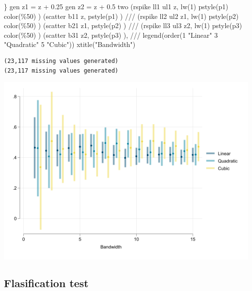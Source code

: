 \documentclass[
  letterpaper,
  DIV=11,
  numbers=noendperiod]{scrartcl}
\newenvironment{Shaded}{\begin{snugshade}}{\end{snugshade}}
\newcommand{\BaseNTok}[1]{\textcolor[rgb]{0.68,0.00,0.00}{#1}}
\newcommand{\CommentTok}[1]{\textcolor[rgb]{0.37,0.37,0.37}{#1}}
\newcommand{\KeywordTok}[1]{\textcolor[rgb]{0.00,0.23,0.31}{#1}}
\newcommand{\NormalTok}[1]{\textcolor[rgb]{0.00,0.23,0.31}{#1}}
\newcommand{\StringTok}[1]{\textcolor[rgb]{0.13,0.47,0.30}{#1}}
\begin{document}
\begin{Shaded}
\begin{Highlighting}[]
\NormalTok{\}}
\KeywordTok{gen}\NormalTok{ z1 = z + 0.25}
\KeywordTok{gen}\NormalTok{ z2 = z + 0.5}
\KeywordTok{two}\NormalTok{ (rspike ll1 ul1 z, lw(1) pstyle(p1) }\KeywordTok{color}\NormalTok{(\%50) ) (}\KeywordTok{scatter}\NormalTok{ b11 z, pstyle(p1) ) }\CommentTok{///}
\NormalTok{    (rspike ll2 ul2 z1, lw(1) pstyle(p2) }\KeywordTok{color}\NormalTok{(\%50) ) (}\KeywordTok{scatter}\NormalTok{ b21 z1, pstyle(p2) ) }\CommentTok{///}
\NormalTok{    (rspike ll3 ul3 z2, lw(1) pstyle(p3) }\KeywordTok{color}\NormalTok{(\%50) ) (}\KeywordTok{scatter}\NormalTok{ b31 z2, pstyle(p3) ), }\CommentTok{///}
    \BaseNTok{legend}\NormalTok{(}\KeywordTok{order}\NormalTok{(1 }\StringTok{"Linear"}\NormalTok{ 3 }\StringTok{"Quadratic"}\NormalTok{ 5 }\StringTok{"Cubic"}\NormalTok{)) }\BaseNTok{xtitle}\NormalTok{(}\StringTok{"Bandwidth"}\NormalTok{)}
\end{Highlighting}
\end{Shaded}

\begin{verbatim}
(23,117 missing values generated)
(23,117 missing values generated)
\end{verbatim}

\includegraphics{11rdd_files/figure-pdf/cell-12-output-2.png}

\subsection{Flasification test}\label{flasification-test}
\end{document}
